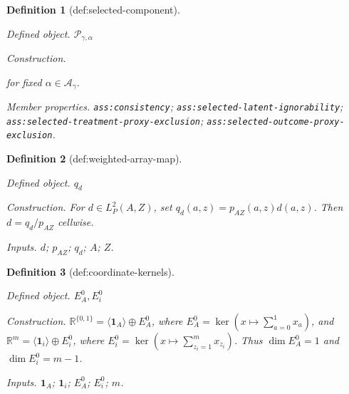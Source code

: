\documentclass{article}
\newtheorem{definition}{Definition}
\begin{document}
\begin{definition}[def:selected-component]\label{def:selected-component}
\par\smallskip\noindent\emph{Defined object.} \(\mathcal P_{\gamma,\alpha}\)
\par\smallskip\noindent\emph{Construction.} \par\noindent {}\par\noindent for fixed \(\alpha\in\mathcal A_\gamma\).
\par\smallskip\noindent\emph{Member properties.} \texttt{ass:\allowbreak{}consistency}; \texttt{ass:\allowbreak{}selected-\allowbreak{}latent-\allowbreak{}ignorability}; \texttt{ass:\allowbreak{}selected-\allowbreak{}treatment-\allowbreak{}proxy-\allowbreak{}exclusion}; \texttt{ass:\allowbreak{}selected-\allowbreak{}outcome-\allowbreak{}proxy-\allowbreak{}exclusion}.
\end{definition}

\begin{definition}[def:weighted-array-map]\label{def:weighted-array-map}
\par\smallskip\noindent\emph{Defined object.} \(q_d\)
\par\smallskip\noindent\emph{Construction.} For \(d\in L_P^2(A,Z)\), set \(q_d(a,z)=p_{AZ}(a,z)d(a,z)\). Then \(d=q_d/p_{AZ}\) cellwise.
\par\smallskip\noindent\emph{Inputs.} \(d\); \(p_{AZ}\); \(q_d\); \(A\); \(Z\).
\end{definition}

\begin{definition}[def:coordinate-kernels]\label{def:coordinate-kernels}
\par\smallskip\noindent\emph{Defined object.} \(E_A^0,E_i^0\)
\par\smallskip\noindent\emph{Construction.} \(\mathbb R^{\{0,1\}}=\langle\mathbf1_A\rangle\oplus E_A^0\), where \(E_A^0=\ker(x\mapsto\sum_{a=0}^1x_a)\), and \(\mathbb R^m=\langle\mathbf1_i\rangle\oplus E_i^0\), where \(E_i^0=\ker(x\mapsto\sum_{z_i=1}^m x_{z_i})\). Thus \(\dim E_A^0=1\) and \(\dim E_i^0=m-1\).
\par\smallskip\noindent\emph{Inputs.} \(\mathbf 1_A\); \(\mathbf 1_i\); \(E_A^0\); \(E_i^0\); \(m\).
\end{definition}
\end{document}
